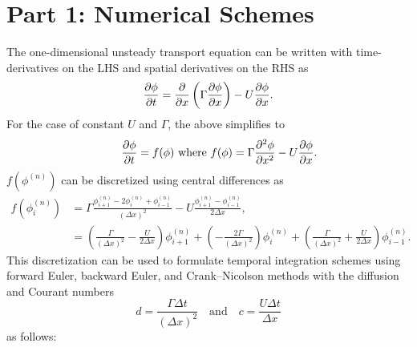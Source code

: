 \documentclass[reqno, 12pt]{amsart}
\begin{document}
    \section*{Part 1: Numerical Schemes}
    \noindent The one-dimensional unsteady transport equation can be written with time-derivatives on the LHS and spatial derivatives on the RHS as
    \begin{equation*}
        \pdiff[\phi]{t} = \pdiff{x}\left(\Gamma\pdiff[\phi]{x}\right) - U\pdiff[\phi]{x}.
    \end{equation*}
    For the case of constant $U$ and $\Gamma$, the above simplifies to
    \begin{equation*}
        \qquad \pdiff[\phi]{t} = f(\phi) \text{ where } f(\phi) = \Gamma\pdifftwo[\phi]{x} - U\pdiff[\phi]{x}.
    \end{equation*}
    $f(\phi^{(n)})$ can be discretized using central differences as
    \begin{align*}
        f(\phi^{(n)}_i) &=
                        \Gamma\frac{\phi^{(n)}_{i + 1} - 2\phi^{(n)}_i + \phi^{(n)}_{i - 1}}{\left(\Delta x\right)^2} -
                        U\frac{\phi^{(n)}_{i + 1} - \phi^{(n)}_{i - 1}}{2\Delta x}, \\
                        &= \left(\frac{\Gamma}{\left(\Delta x\right)^2} - \frac{U}{2\Delta x}\right)\phi^{(n)}_{i + 1} +
                        \left(-\frac{2\Gamma}{\left(\Delta x\right)^2}\right)\phi^{(n)}_{i} +
                        \left(\frac{\Gamma}{\left(\Delta x\right)^2} + \frac{U}{2\Delta x}\right)\phi^{(n)}_{i - 1}.
    \end{align*}
    This discretization can be used to formulate temporal integration schemes using forward Euler, backward Euler, and Crank--Nicolson methods with the diffusion and Courant numbers
    \begin{equation*}
        d = \frac{\Gamma \Delta t}{\left(\Delta x\right)^2} \quad \text{and} \quad c = \frac{U\Delta t}{\Delta x}
    \end{equation*}
    as follows:
\end{document}
